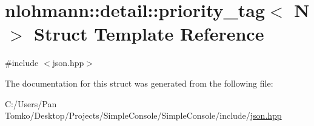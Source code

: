 \hypertarget{structnlohmann_1_1detail_1_1priority__tag}{}\section{nlohmann\+::detail\+::priority\+\_\+tag$<$ N $>$ Struct Template Reference}
\label{structnlohmann_1_1detail_1_1priority__tag}


{\ttfamily \#include $<$json.\+hpp$>$}



The documentation for this struct was generated from the following file\+:\begin{DoxyCompactItemize}
\item 
C\+:/\+Users/\+Pan Tomko/\+Desktop/\+Projects/\+Simple\+Console/\+Simple\+Console/include/\mbox{\hyperlink{json_8hpp}{json.\+hpp}}\end{DoxyCompactItemize}
